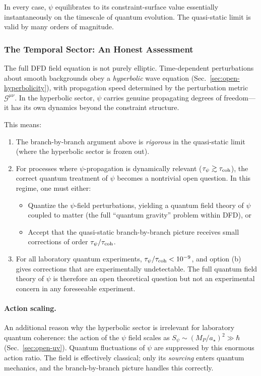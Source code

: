 In every case, $\psi$ equilibrates to its constraint-surface value essentially instantaneously on the timescale of quantum evolution.  The quasi-static limit is valid by many orders of magnitude.

\subsubsection{The Temporal Sector: An Honest Assessment}\label{sec:temporal-honest}

The full DFD field equation is not purely elliptic.  Time-dependent perturbations about smooth backgrounds obey a \emph{hyperbolic} wave equation (Sec.~\ref{sec:open-hyperbolicity}), with propagation speed determined by the perturbation metric $\mathcal{G}^{\mu\nu}$.  In the hyperbolic sector, $\psi$ carries genuine propagating degrees of freedom---it has its own dynamics beyond the constraint structure.

This means:

\begin{enumerate}
\item The branch-by-branch argument above is \emph{rigorous} in the quasi-static limit (where the hyperbolic sector is frozen out).

\item For processes where $\psi$-propagation is dynamically relevant ($\tau_\psi \gtrsim \tau_{\rm coh}$), the correct quantum treatment of $\psi$ becomes a nontrivial open question.  In this regime, one must either:
\begin{itemize}
\item[(a)] Quantize the $\psi$-field perturbations, yielding a quantum field theory of $\psi$ coupled to matter (the full ``quantum gravity'' problem within DFD), or
\item[(b)] Accept that the quasi-static branch-by-branch picture receives small corrections of order $\tau_\psi/\tau_{\rm coh}$.
\end{itemize}

\item For all laboratory quantum experiments, $\tau_\psi/\tau_{\rm coh} < 10^{-9}$, and option (b) gives corrections that are experimentally undetectable.  The full quantum field theory of $\psi$ is therefore an open theoretical question but not an experimental concern in any foreseeable experiment.
\end{enumerate}

\paragraph{Action scaling.}
An additional reason why the hyperbolic sector is irrelevant for laboratory quantum coherence: the action of the $\psi$ field scales as $S_\psi \sim (M_P/a_\star)^2 \gg \hbar$ (Sec.~\ref{sec:open-uv}).  Quantum fluctuations of $\psi$ are suppressed by this enormous action ratio.  The field is effectively classical; only its \emph{sourcing} enters quantum mechanics, and the branch-by-branch picture handles this correctly.

